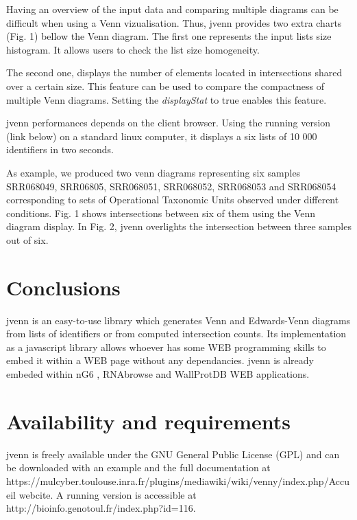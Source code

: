 \documentclass{bmcart}
\begin{document}
Having an overview of the input data and comparing multiple diagrams can be difficult when using a Venn vizualisation. Thus, jvenn provides two extra 
charts (Fig. 1) bellow the Venn diagram. The first one represents the input lists size histogram. It allows users to check the list size homogeneity. 

The second one, displays the number of elements located in intersections shared over a certain size. This feature can be used to compare the compactness
of multiple Venn diagrams. Setting the \textit{displayStat} to true enables this feature.

jvenn performances depends on the client browser. Using the running version (link below) on a standard linux computer, it displays a six lists of 10 000 
identifiers in two seconds.

As example, we produced two venn diagrams representing six samples SRR068049, SRR06805, SRR068051, SRR068052, SRR068053 and 
SRR068054 corresponding to sets of Operational Taxonomic Units observed under different conditions. Fig. 1 shows intersections
between six of them using the Venn diagram display. In Fig. 2, jvenn overlights the intersection between three samples out of 
six.


\section*{Conclusions}

jvenn is an easy-to-use library which generates Venn and Edwards-Venn diagrams from lists of identifiers or from
computed intersection counts. Its implementation as a javascript library allows whoever has some WEB programming skills to embed it 
within a WEB page without any dependancies. jvenn is already embeded within nG6 \cite{Mariette2012}, RNAbrowse 
\cite{Mariette} and WallProtDB \cite{SanClemente} WEB applications.

\section*{Availability and requirements}

jvenn is freely available under the GNU General Public License (GPL) and can be downloaded with an example and the full documentation
at https://mulcyber.toulouse.inra.fr/plugins/mediawiki/wiki/venny/index.php/Accueil webcite. A running version is accessible at 
http://bioinfo.genotoul.fr/index.php?id=116.

\end{document}
